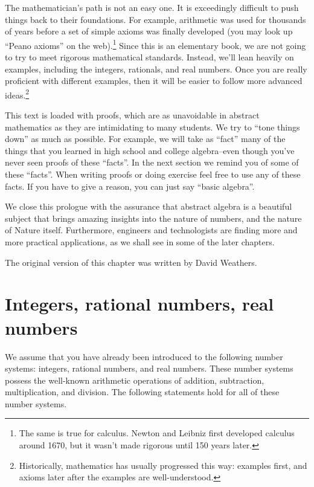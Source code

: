 The mathematician's path is not an easy one. It is exceedingly  difficult to push things back to their foundations. For example, arithmetic was used for thousands of years before a set of simple axioms was finally developed (you may look up ``Peano axioms'' on the web).\footnote{The same is true for calculus. Newton and Leibniz first developed calculus around 1670, but it wasn't made rigorous until 150 years later.}
Since this is an elementary book, we are not going to try to meet rigorous mathematical standards. Instead, we'll lean heavily on examples, including the integers, rationals, and real numbers. Once you are really proficient with different examples, then it will be easier to follow more advanced ideas.\footnote{Historically, mathematics has usually progressed this way: examples first, 
and axioms later after the examples are well-understood.}

This text is loaded with proofs, which are as unavoidable in abstract mathematics as they are intimidating to many students. We try to ``tone things down'' as much as possible. For example, we will take as ``fact'' many of the things that you learned in high school and  college algebra--even though you've never seen proofs of these ``facts''.  In the next section  we remind you of some of these ``facts''.  When writing proofs or doing exercise feel free to use any of these facts.  If you have to give a reason, you can just say  ``basic algebra''.

We close this prologue with the assurance that abstract algebra is a beautiful subject that brings amazing insights into the nature of numbers, and the nature of Nature itself. Furthermore, engineers and technologists are finding more and more practical applications, as we shall see in some of the later chapters.

The original version of this chapter was written by David Weathers. 

\section{Integers, rational numbers, real numbers}
\label{sec:Preliminaries:IntegersRationalRealNumbers}


We assume that you have already been introduced to the following number systems: integers, rational numbers, and real numbers.  These number systems possess the well-known arithmetic operations of addition, subtraction, multiplication, and division. The following statements hold for all of these number systems. 

